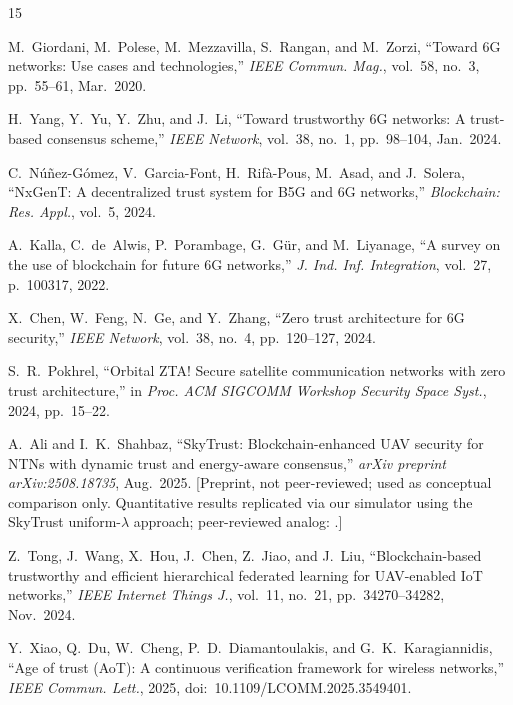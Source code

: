 \documentclass[journal,twoside,10pt]{IEEEtran}
\begin{document}
\begin{thebibliography}{15}

M.~Giordani, M.~Polese, M.~Mezzavilla, S.~Rangan, and M.~Zorzi,
``Toward 6G networks: Use cases and technologies,''
\textit{IEEE Commun. Mag.}, vol.~58, no.~3, pp.~55--61, Mar.~2020.

H.~Yang, Y.~Yu, Y.~Zhu, and J.~Li,
``Toward trustworthy 6G networks: A trust-based consensus scheme,''
\textit{IEEE Network}, vol.~38, no.~1, pp.~98--104, Jan.~2024.

C.~N\'{u}\~{n}ez-G\'{o}mez, V.~Garcia-Font, H.~Rif\`{a}-Pous,
M.~Asad, and J.~Solera,
``NxGenT: A decentralized trust system for B5G and 6G networks,''
\textit{Blockchain: Res. Appl.}, vol.~5, 2024.

A.~Kalla, C.~de~Alwis, P.~Porambage, G.~G\"{u}r, and M.~Liyanage,
``A survey on the use of blockchain for future 6G networks,''
\textit{J. Ind. Inf. Integration}, vol.~27, p.~100317, 2022.

X.~Chen, W.~Feng, N.~Ge, and Y.~Zhang,
``Zero trust architecture for 6G security,''
\textit{IEEE Network}, vol.~38, no.~4, pp.~120--127, 2024.

S.~R.~Pokhrel,
``Orbital ZTA! Secure satellite communication networks with zero trust
architecture,''
in \textit{Proc. ACM SIGCOMM Workshop Security Space Syst.}, 2024,
pp.~15--22.

A.~Ali and I.~K.~Shahbaz,
``SkyTrust: Blockchain-enhanced UAV security for NTNs with dynamic
trust and energy-aware consensus,''
\textit{arXiv preprint arXiv:2508.18735}, Aug.~2025.
[Preprint, not peer-reviewed; used as conceptual comparison only.
Quantitative results replicated via our simulator using the
SkyTrust uniform-$\lambda$ approach; peer-reviewed analog: \cite{tong2024}.]

Z.~Tong, J.~Wang, X.~Hou, J.~Chen, Z.~Jiao, and J.~Liu,
``Blockchain-based trustworthy and efficient hierarchical federated
learning for UAV-enabled IoT networks,''
\textit{IEEE Internet Things J.}, vol.~11, no.~21,
pp.~34270--34282, Nov.~2024.

Y.~Xiao, Q.~Du, W.~Cheng, P.~D.~Diamantoulakis, and
G.~K.~Karagiannidis,
``Age of trust (AoT): A continuous verification framework for wireless
networks,''
\textit{IEEE Commun. Lett.}, 2025, doi:~10.1109/LCOMM.2025.3549401.


\end{thebibliography}
\end{document}
